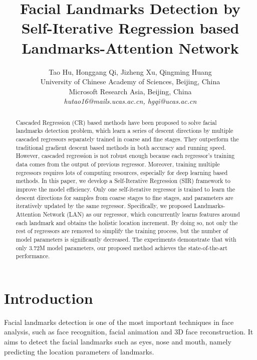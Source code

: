 \documentclass[letterpaper]{article} \usepackage{aaai18}  \usepackage{times}  \usepackage{helvet}  \usepackage{courier}  \usepackage{url}  \usepackage{graphicx}
\begin{document}
\title{Facial Landmarks Detection by Self-Iterative Regression based Landmarks-Attention Network}
\author{Tao Hu, Honggang Qi, Jizheng Xu, Qingming Huang\\
 University of Chinese Academy of Sciences, Beijing, China\\
 Microsoft Research Asia, Beijing, China\\
\textit {hutao16@mails.ucas.ac.cn, hgqi@ucas.ac.cn}
}
\maketitle
\begin{abstract}
Cascaded Regression (CR) based methods have been proposed to solve facial landmarks detection problem, which learn a series of descent directions by multiple cascaded regressors separately trained in coarse and fine stages. They outperform the traditional gradient descent based methods in both accuracy and running speed. However, cascaded regression is not robust enough because each regressor's training data comes from the output of previous regressor. Moreover, training multiple regressors requires lots of computing resources, especially for deep learning based methods. In this paper, we develop a Self-Iterative Regression (SIR) framework to improve the model efficiency. Only one self-iterative regressor is trained to learn the descent directions for samples from coarse stages to fine stages, and parameters are iteratively updated by the same regressor. Specifically, we proposed Landmarks-Attention Network (LAN) as our regressor, which concurrently learns features around each landmark and obtains the holistic location increment. By doing so, not only the rest of regressors are removed to simplify the training process, but the number of model parameters is significantly decreased. The experiments demonstrate that with only 3.72M model parameters, our proposed method achieves the state-of-the-art performance.
\end{abstract}

\section{Introduction} \label{sec:intro}
Facial landmarks detection is one of the most important techniques in face analysis, such as face recognition, facial animation and 3D face reconstruction. It aims to detect the facial landmarks such as eyes, nose and mouth, namely predicting the location parameters of landmarks. 
\end{document}
